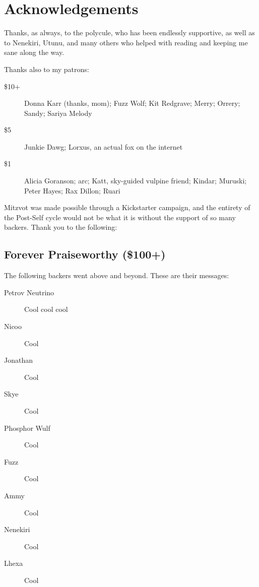\chapter*{Acknowledgements}

Thanks, as always, to the polycule, who has been endlessly supportive, as well as to Nenekiri, Utunu, and many others who helped with reading and keeping me sane along the way.

Thanks also to my patrons:

\begin{description}
    \item[\$10+]
    Donna Karr (thanks, mom); Fuzz Wolf; Kit Redgrave; Merry; Orrery; Sandy; Sariya Melody

    \item[\$5]
    Junkie Dawg; Lorxus, an actual fox on the internet

    \item[\$1]
    Alicia Goranson; arc; Katt, sky-guided vulpine friend; Kindar; Muruski; Peter Hayes; Rax Dillon; Ruari
\end{description}

Mitzvot was made possible through a Kickstarter campaign, and the entirety of the Post-Self cycle would not be what it is without the support of so many backers. Thank you to the following:

\section*{Forever Praiseworthy (\$100+)}

The following backers went above and beyond. These are their messages:

\begin{description}
  \item[Petrov Neutrino]
  Cool cool cool

  \item[Nicoo]
  Cool

  \item[Jonathan]
  Cool

  \item[Skye]
  Cool
  
  \item[Phosphor Wulf]
  Cool

  \item[Fuzz]
  Cool

  \item[Ammy]
  Cool

  \item[Nenekiri]
  Cool

  \item[Lhexa]
  Cool
\end{description}

